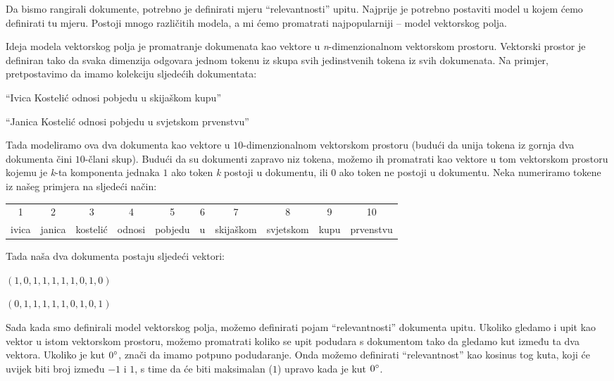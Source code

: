 \documentclass[a4paper,twoside,12pt]{scrreprt}
\begin{document}
Da bismo rangirali dokumente, potrebno je definirati mjeru ``relevantnosti'' upitu. Najprije je potrebno postaviti model u kojem ćemo definirati tu mjeru. Postoji mnogo različitih modela, a mi ćemo promatrati najpopularniji – model vektorskog polja.

Ideja modela vektorskog polja je promatranje dokumenata kao vektore u \textit{n}-dimenzionalnom vektorskom prostoru. Vektorski prostor je definiran tako da svaka dimenzija odgovara jednom tokenu iz skupa svih jedinstvenih tokena iz svih dokumenata. Na primjer, pretpostavimo da imamo kolekciju sljedećih dokumentata:

\begin{compactenum}
  \item ``Ivica Kostelić odnosi pobjedu u skijaškom kupu''
  \item ``Janica Kostelić odnosi pobjedu u svjetskom prvenstvu''
\end{compactenum}

Tada modeliramo ova dva dokumenta kao vektore u $10$-dimenzionalnom vektorskom prostoru (budući da unija tokena iz gornja dva dokumenta čini $10$-člani skup). Budući da su dokumenti zapravo niz tokena, možemo ih promatrati kao vektore u tom vektorskom prostoru kojemu je \textit{k}-ta komponenta jednaka $1$ ako token \textit{k} postoji u dokumentu, ili $0$ ako token ne postoji u dokumentu. Neka numeriramo tokene iz našeg primjera na sljedeći način:

\begin{center}
  \begin{tabular}{@{\enspace}c@{\enspace}c@{\enspace}c@{\enspace}c@{\enspace}c@{\enspace}c@{\enspace}c@{\enspace}c@{\enspace}c@{\enspace}c@{\enspace}}
    1     & 2      & 3        & 4      & 5       & 6 & 7         & 8         & 9    & 10        \\
    ivica & janica & kostelić & odnosi & pobjedu & u & skijaškom & svjetskom & kupu & prvenstvu \\
  \end{tabular}
\end{center}

Tada naša dva dokumenta postaju sljedeći vektori:

\begin{compactenum}
  \item $(1,0,1,1,1,1,1,0,1,0)$
  \item $(0,1,1,1,1,1,0,1,0,1)$
\end{compactenum}

Sada kada smo definirali model vektorskog polja, možemo definirati pojam ``relevantnosti'' dokumenta upitu. Ukoliko gledamo i upit kao vektor u istom vektorskom prostoru, možemo promatrati koliko se upit podudara s dokumentom tako da gledamo kut između ta dva vektora. Ukoliko je kut $0\degree$, znači da imamo potpuno podudaranje. Onda možemo definirati ``relevantnost'' kao kosinus tog kuta, koji će uvijek biti broj između $-1$ i $1$, s time da će biti maksimalan ($1$) upravo kada je kut $0\degree$.
\end{document}
